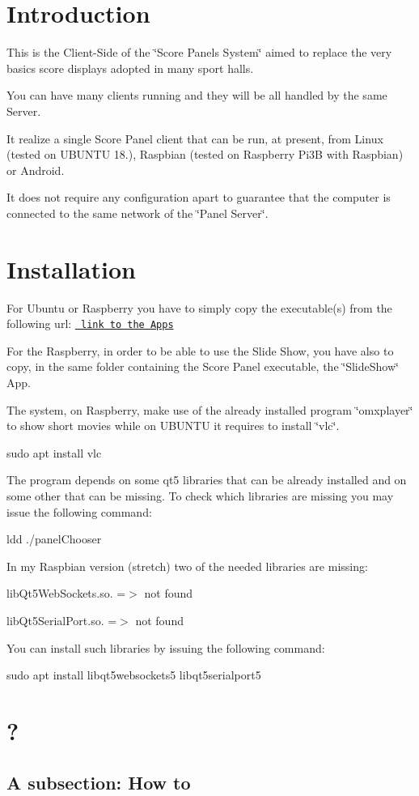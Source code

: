 \hypertarget{index_intro}{}\section{Introduction}\label{index_intro}
This is the Client-\/Side of the \char`\"{}\+Score Panels System\char`\"{} aimed to replace the very basics score displays adopted in many sport halls.

You can have many clients running and they will be all handled by the same Server.

It realize a single Score Panel client that can be run, at present, from Linux (tested on U\+B\+U\+N\+TU 18.), Raspbian (tested on Raspberry Pi3B with Raspbian) or Android.

It does not require any configuration apart to guarantee that the computer is connected to the same network of the \char`\"{}\+Panel Server\char`\"{}.\hypertarget{index_install}{}\section{Installation}\label{index_install}
For Ubuntu or Raspberry you have to simply copy the executable(s) from the following url\+: \href{https://github.com/salvato/ScorePanel_Executables}\texttt{ link to the Apps}

For the Raspberry, in order to be able to use the Slide Show, you have also to copy, in the same folder containing the Score Panel executable, the \char`\"{}\+Slide\+Show\char`\"{} App.

The system, on Raspberry, make use of the already installed program \char`\"{}omxplayer\char`\"{} to show short movies while on U\+B\+U\+N\+TU it requires to install \char`\"{}vlc\char`\"{}.

sudo apt install vlc

The program depends on some qt5 libraries that can be already installed and on some other that can be missing. To check which libraries are missing you may issue the following command\+:

ldd ./panel\+Chooser

In my Raspbian version (stretch) two of the needed libraries are missing\+:

lib\+Qt5\+Web\+Sockets.\+so. =$>$ not found

lib\+Qt5\+Serial\+Port.\+so. =$>$ not found

You can install such libraries by issuing the following command\+:

sudo apt install libqt5websockets5 libqt5serialport5\hypertarget{index_boh}{}\section{?}\label{index_boh}
\hypertarget{index_sub1}{}\subsection{A subsection\+: How to}\label{index_sub1}
